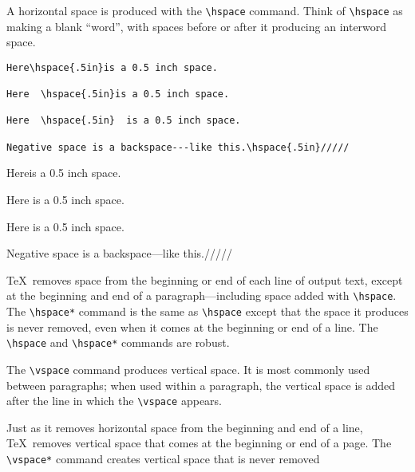 \documentclass{article}
\newcommand{\justtext}[1]{\texttt{\textbackslash #1}}
\begin{document}
A horizontal space is produced with the \justtext{hspace} command. Think of \justtext{hspace} as
making a blank ``word'', with spaces before or after it producing an interword space.

\begin{verbatim}
Here\hspace{.5in}is a 0.5 inch space.

Here  \hspace{.5in}is a 0.5 inch space.

Here  \hspace{.5in}  is a 0.5 inch space.

Negative space is a backspace---like this.\hspace{.5in}/////
\end{verbatim}

Here\hspace{.5in}is a 0.5 inch space.

Here  \hspace{.5in}is a 0.5 inch space.

Here  \hspace{.5in}  is a 0.5 inch space.

Negative space is a backspace---like this.\hspace{.5in}///// %

\TeX\ removes space from the beginning or end of each line of output text, except at the beginning
and end of a paragraph---including space added with \justtext{hspace}. 
The \justtext{hspace*} command is the same as \justtext{hspace} except that the space it produces is
never removed, even when it comes at the beginning or end of a line. 
The \justtext{hspace} and \justtext{hspace*} commands are robust.

The \justtext{vspace} command produces vertical space. It is most commonly used between paragraphs;
when used within a paragraph, the vertical space is added after the line in which the 
\justtext{vspace} appears.

Just as it removes horizontal space from the beginning and end of a line, \TeX\ removes vertical
space that comes at the beginning or end of a page. The \justtext{vspace*} command creates vertical
space that is never removed

\end{document}
